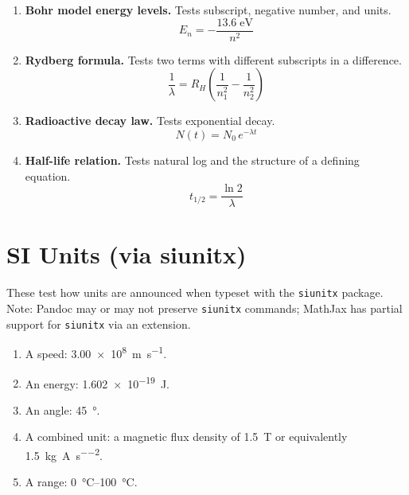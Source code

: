 \documentclass[11pt]{article}
\begin{document}
\begin{enumerate}

\item \textbf{Bohr model energy levels.}
Tests subscript, negative number, and units.
\[
  E_n = -\frac{13.6\;\text{eV}}{n^2}
\]

\item \textbf{Rydberg formula.}
Tests two terms with different subscripts in a difference.
\[
  \frac{1}{\lambda} = R_H \left(\frac{1}{n_1^2} - \frac{1}{n_2^2}\right)
\]

\item \textbf{Radioactive decay law.}
Tests exponential decay.
\[
  N(t) = N_0\, e^{-\lambda t}
\]

\item \textbf{Half-life relation.}
Tests natural log and the structure of a defining equation.
\[
  t_{1/2} = \frac{\ln 2}{\lambda}
\]

\end{enumerate}

\section{SI Units (via siunitx)}

These test how units are announced when typeset with the \texttt{siunitx}
package. Note: Pandoc may or may not preserve \texttt{siunitx} commands;
MathJax has partial support for \texttt{siunitx} via an extension.

\begin{enumerate}

\item A speed: \SI{3.00e8}{\meter\per\second}.

\item An energy: \SI{1.602e-19}{\joule}.

\item An angle: \SI{45}{\degree}.

\item A combined unit: a magnetic flux density of
\SI{1.5}{\tesla} or equivalently \SI{1.5}{\kilogram\per\ampere\per\second\squared}.

\item A range: \SIrange{0}{100}{\celsius}.

\end{enumerate}
\end{document}
